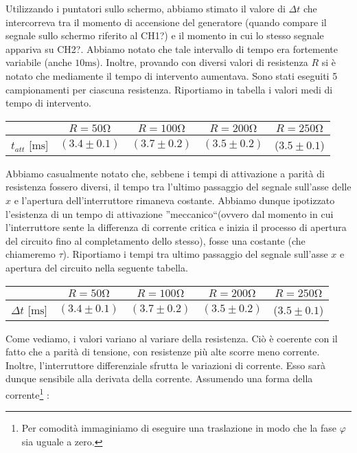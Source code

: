 Utilizzando i puntatori sullo schermo, abbiamo stimato il valore di $\Delta t$ che intercorreva tra il momento di accensione del generatore (quando compare il segnale sullo schermo riferito al CH1?) e il momento in cui lo stesso segnale appariva su CH2?. Abbiamo notato che tale intervallo di tempo era fortemente variabile (anche $10\si{\milli\second}$). Inoltre, provando con diversi valori di resistenza $R$ si è notato che mediamente il tempo di intervento aumentava. Sono stati eseguiti 5 campionamenti per ciascuna resistenza. Riportiamo in tabella i valori medi di tempo di intervento.

\begin{SCtable}[20]
\centering
\caption{}
{\renewcommand{\arraystretch}{1.6}%
\begin{tabular}{c|c|c|c|c}
 & $R=50 \si{\ohm}$ & $R=100 \si{\ohm}$ & $R=200 \si{\ohm}$ & $R=250 \si{\ohm}$ \\      \hline
$t_{att}$ [$\si{\milli\second}$] & $(3.4 \pm 0.1)$ & $(3.7 \pm 0.2)$ & $(3.5 \pm 0.2)$ & ($3.5 \pm 0.1$) \\
\end{tabular}}
\end{SCtable}


Abbiamo casualmente notato che, sebbene i tempi di attivazione a parità di resistenza fossero diversi, il tempo tra l'ultimo passaggio del segnale sull'asse delle $x$ e l'apertura dell'interruttore rimaneva costante. Abbiamo dunque ipotizzato l'esistenza di un tempo di attivazione ''meccanico``(ovvero dal momento in cui l'interruttore sente la differenza di corrente critica e inizia il processo di apertura del circuito fino al completamento dello stesso), fosse una costante (che chiameremo $\tau$).  Riportiamo i tempi tra ultimo passaggio del segnale sull'asse $x$ e apertura del circuito nella seguente tabella. 

\begin{SCtable}[20]
\centering
\caption{}
{\renewcommand{\arraystretch}{1.6}%
\begin{tabular}{c|c|c|c|c}
 & $R=50 \si{\ohm}$ & $R=100 \si{\ohm}$ & $R=200 \si{\ohm}$ & $R=250 \si{\ohm}$ \\      \hline
$\Delta t$ [$\si{\milli\second}$] & $(3.4 \pm 0.1)$ & $(3.7 \pm 0.2)$ & $(3.5 \pm 0.2)$ & ($3.5 \pm 0.1$) \\
\end{tabular}}
\end{SCtable}

Come vediamo, i valori variano al variare della resistenza. Ciò è coerente con il fatto che a parità di tensione, con resistenze più alte scorre meno corrente. Inoltre, l'interruttore differenziale sfrutta le variazioni di corrente. Esso sarà dunque sensibile alla derivata della corrente. Assumendo una forma della corrente\footnote{Per comodità immaginiamo di eseguire una traslazione in modo che la fase $\varphi$ sia uguale a zero.} :

